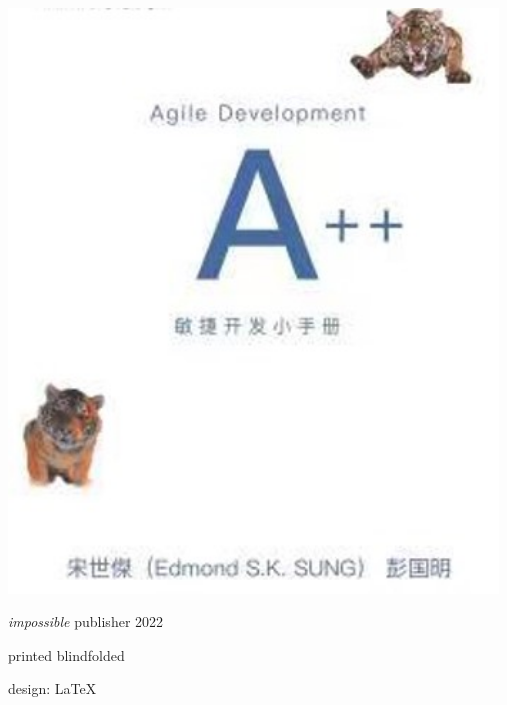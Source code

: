 \documentclass{book}        %
\date{}
\begin{document}


\begin{titlepage}\thispagestyle{empty} \vspace*{3em}
\includegraphics[width=13cm]{aBookCover2latexScreenshot2023-03-08130046.jpg}
\clearpage\newpage \thispagestyle{empty} \mbox{} \cleardoublepage

\thispagestyle{empty} \cleardoublepage

\thispagestyle{empty} \vspace*{\fill} \parbox{.8\textwidth}{\raggedright \scriptsize
\textit{impossible} publisher 2022

printed blindfolded

design: \LaTeX
}
\end{titlepage}
\clearpage \thispagestyle{empty}\cleardoublepage
\newpage %
\end{document}
